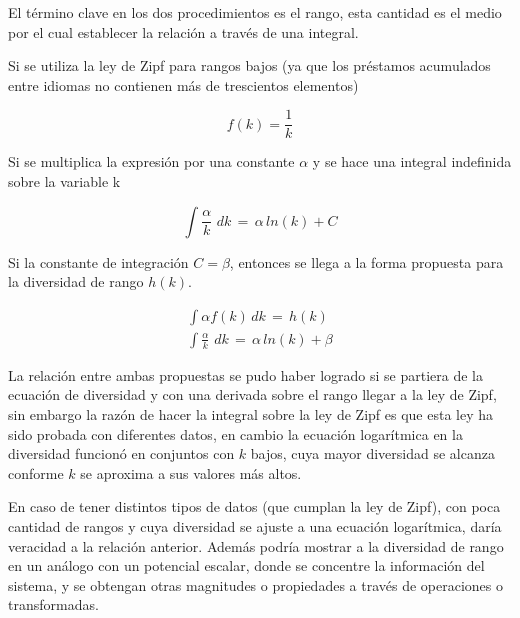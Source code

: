 El término clave en los dos procedimientos es el rango, esta cantidad es el medio por el cual establecer la relación a través de una integral.

Si se utiliza la ley de Zipf para rangos bajos (ya que los préstamos acumulados entre idiomas no contienen más de trescientos elementos)

\begin{equation}
\label{ec.Zipf_kbajos}
f(k)  =  \frac{1}{k} 
\end{equation} 


Si se multiplica la expresión por una constante $\alpha$ y se hace una integral indefinida sobre la variable k

\begin{equation}
\label{ec.Zipf_int}
\int \frac{\alpha}{k}\,\,dk \, = \, \alpha \, ln \left(k\right) + C
\end{equation} 

Si la constante de integración $C = \beta$, entonces se llega a la forma propuesta para la diversidad de rango $h(k)$.  

\begin{subequations}
	\begin{align}
	\label{ec.Zipf_dk}
	\int \alpha f\left(k\right) \,dk \,=\, h(k) \\
	\int \frac{\alpha}{k}\,\,dk \, = \, \alpha \, ln \left(k\right) + \beta	
	\end{align}
\end{subequations}


La relación entre ambas propuestas se pudo haber logrado si se partiera de la ecuación de diversidad y con una derivada sobre el rango llegar a la ley de Zipf, sin embargo la razón de hacer la integral sobre la ley de Zipf es que esta ley  ha sido probada con diferentes datos, en cambio la ecuación logarítmica en la diversidad funcionó en conjuntos con $k$ bajos, cuya mayor diversidad se alcanza conforme $k$ se aproxima a sus valores más altos.  

En caso de tener distintos tipos de datos (que cumplan la ley de Zipf), con poca cantidad de rangos y cuya diversidad se ajuste a una ecuación logarítmica, daría veracidad a la relación anterior. Además podría mostrar a la diversidad de rango en un análogo con un potencial escalar, donde se concentre la información del sistema, y se obtengan otras magnitudes o propiedades a través  de operaciones o transformadas. 

 



